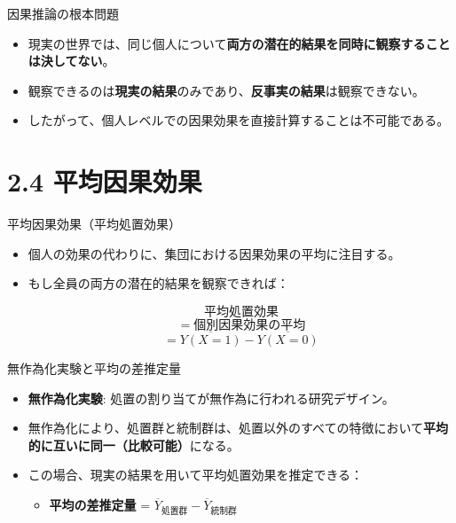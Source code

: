 \documentclass[
  ignorenonframetext,
]{beamer}
\providecommand{\tightlist}{%
  \setlength{\itemsep}{0pt}\setlength{\parskip}{0pt}}
\begin{document}
\begin{frame}{因果推論の根本問題}
\protect\hypertarget{ux56e0ux679cux63a8ux8ad6ux306eux6839ux672cux554fux984c}{}
\begin{itemize}
\tightlist
\item
  現実の世界では、同じ個人について\textbf{両方の潜在的結果を同時に観察することは決してない}。
\item
  観察できるのは\textbf{現実の結果}のみであり、\textbf{反事実の結果}は観察できない。
\item
  したがって、個人レベルでの因果効果を直接計算することは不可能である。
\end{itemize}
\end{frame}

\hypertarget{ux5e73ux5747ux56e0ux679cux52b9ux679c}{%
\section{2.4 平均因果効果}\label{ux5e73ux5747ux56e0ux679cux52b9ux679c}}

\begin{frame}{平均因果効果（平均処置効果）}
\protect\hypertarget{ux5e73ux5747ux56e0ux679cux52b9ux679cux5e73ux5747ux51e6ux7f6eux52b9ux679c}{}
\begin{itemize}
\item
  個人の効果の代わりに、集団における因果効果の平均に注目する。
\item
  もし全員の両方の潜在的結果を観察できれば：

  \[平均処置効果 \] \[= 個別因果効果の平均 \]
  \[=\overline{Y(X=1)} - \overline{Y(X=0)}\]
\end{itemize}
\end{frame}

\begin{frame}{無作為化実験と平均の差推定量}
\protect\hypertarget{ux7121ux4f5cux70baux5316ux5b9fux9a13ux3068ux5e73ux5747ux306eux5deeux63a8ux5b9aux91cf}{}
\begin{itemize}
\tightlist
\item
  \textbf{無作為化実験}: 処置の割り当てが無作為に行われる研究デザイン。
\item
  無作為化により、処置群と統制群は、処置以外のすべての特徴において\textbf{平均的に互いに同一（比較可能）}になる。
\item
  この場合、現実の結果を用いて平均処置効果を推定できる：

  \begin{itemize}
  \tightlist
  \item
    \textbf{平均の差推定量} =
    \(\overline{Y}_{\text{処置群}} - \overline{Y}_{\text{統制群}}\)
  \end{itemize}
\end{itemize}
\end{frame}
\end{document}
